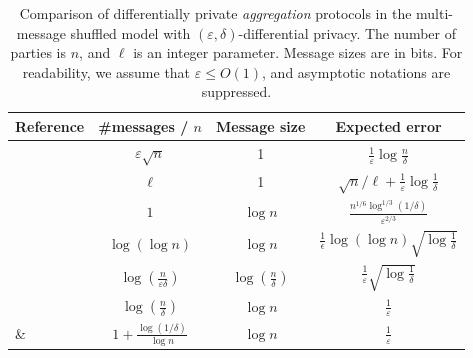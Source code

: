 \begin{table}[t]
    \centering
    \footnotesize
    \def\arraystretch{1.75}
    \begin{tabular}{@{}lccc@{}}
        \toprule
        {\bf Reference} & 
        {\bf \#messages / $n$} & 
        {\bf Message size} & 
        {\bf Expected error}\\
        \midrule
        \cite{cheu2019distributed} & 
        $\varepsilon\sqrt{n}$
        & 1 
        & $\frac{1}{\varepsilon} \log\frac{n}{\delta}$
        \\
        \cite{cheu2019distributed}
        & $\ell$
        & 1 
        &
        $\sqrt{n} / \ell + \frac{1}{\varepsilon} \log\frac{1}{\delta}$
        \\
        \cite{BalleBGN19} & $1$ & $\log n$ & $\frac{n^{1/6}\log^{1/3}(1/\delta)}{\varepsilon^{2/3}}$\\
        \cite{balle2020} &
        $\log (\log n)$ &
        $\log n$ &
        $\frac{1}{\epsilon} \log(\log n )\sqrt{\log \frac{1}{\delta}}$ \\        
        \cite{ghazi2019scalable_1} &
        $\log(\frac{n}{\varepsilon \delta})$ & $\log(\frac{n}{\delta})$ & $\frac{1}{\varepsilon} \sqrt{\log\frac{1}{\delta}}$\\ 
        \cite{balle2020} &
        $\log(\frac{n}{\delta})$ & $\log n$ & $\frac{1}{\varepsilon}$\\         
        \cite{ghazi2019scalable} \& \cite{balle2020} & $1 + \frac{\log(1/\delta)}{\log n}$ & $\log n$ & $\frac{1}{\varepsilon}$ \\
        \bottomrule
    \end{tabular}
    \caption{Comparison of differentially private \emph{aggregation} protocols in the multi-message shuffled model with $(\varepsilon,\delta)$-differential privacy. 
    The number of parties is $n$, and $\ell$ is an integer parameter.
    Message sizes are in bits. For readability, we assume that $\varepsilon \leq O(1)$, and asymptotic notations are suppressed.
    }
    \label{table:aggregation_shuffled_comparison}
\end{table}

